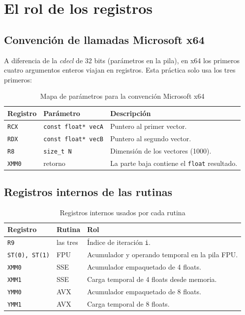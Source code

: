 \documentclass[12pt, letterpaper]{article}
\begin{document}
\section{El rol de los registros}

\subsection{Convención de llamadas Microsoft x64}

A diferencia de la \textit{cdecl} de 32 bits (parámetros en la pila), en x64 los primeros cuatro argumentos enteros viajan en registros. Esta práctica solo usa los tres primeros:

\begin{table}[H]
    \centering
    \begin{tabular}{@{}llp{6.5cm}@{}}
        \toprule
        \textbf{Registro} & \textbf{Parámetro} & \textbf{Descripción} \\
        \midrule
        \texttt{RCX} & \texttt{const float* vecA} & Puntero al primer vector. \\
        \texttt{RDX} & \texttt{const float* vecB} & Puntero al segundo vector. \\
        \texttt{R8}  & \texttt{size\_t N}         & Dimensión de los vectores (1000). \\
        \texttt{XMM0} & retorno                   & La parte baja contiene el \texttt{float} resultado. \\
        \bottomrule
    \end{tabular}
    \caption{Mapa de parámetros para la convención Microsoft x64}
\end{table}

\subsection{Registros internos de las rutinas}

\begin{table}[H]
    \centering
    \begin{tabular}{@{}llp{7cm}@{}}
        \toprule
        \textbf{Registro} & \textbf{Rutina} & \textbf{Rol} \\
        \midrule
        \texttt{R9}            & las tres   & Índice de iteración \texttt{i}. \\
        \texttt{ST(0), ST(1)}  & FPU        & Acumulador y operando temporal en la pila FPU. \\
        \texttt{XMM0}          & SSE        & Acumulador empaquetado de 4 floats. \\
        \texttt{XMM1}          & SSE        & Carga temporal de 4 floats desde memoria. \\
        \texttt{YMM0}          & AVX        & Acumulador empaquetado de 8 floats. \\
        \texttt{YMM1}          & AVX        & Carga temporal de 8 floats. \\
        \bottomrule
    \end{tabular}
    \caption{Registros internos usados por cada rutina}
\end{table}
\end{document}
